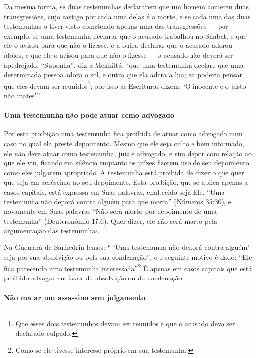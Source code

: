 Da mesma forma, se duas testemunhas declararem que um homem cometeu duas
transgressões, cujo castigo por cada uma delas é a morte, e se cada uma
das duas testemunhas o tiver visto cometendo apenas uma das
transgressões --- por exemplo, se uma testemunha declarar que o acusado
trabalhou no Shabat, e que ele o avisou para que não o fizesse, e a
outra declarar que o acusado adorou ídolos, e que ele o avisou para que
não o fizesse --- o acusado não deverá ser apedrejado. ``Suponha'', diz
a Mekhiltá, ``que uma testemunha declare que uma determinada pessoa
adora o sol, e outra que ela adora a lua;
eu poderia pensar que eles devam ser reunidos\footnote{Que esses dois testemunhos devam ser reunidos e que o acusado deva ser declarado culpado.}; por
isso as Escrituras dizem: `O inocente e o justo não mates'''.

\paragraph{Uma testemunha não pode atuar como advogado}

Por esta proibição uma testemunha fica proibida de atuar como advogado
num caso no qual ela preste depoimento. Mesmo que ele seja culto e bem
informado, ele não deve atuar como testemunha, juiz e advogado, e sim
depor com relação ao que ele viu, ficando em silêncio enquanto os juízes
fizerem uso de seu depoimento como eles julgarem apropriado. A
testemunha está proibida de dizer o que quer que seja em acréscimo ao
seu depoimento. Esta proibição, que se aplica apenas a casos capitais,
está expressa em Suas palavras, enaltecido seja Ele, ``Uma testemunha
não deporá contra alguém para que morra'' (Números 35:30), e novamente
em Suas palavras ``Não será morto por depoimento de uma testemunha''
(Deuteronômio 17:6). Quer dizer, ele não será morto pela argumentação
das testemunhas.

Na Guemará de Sanhedrin lemos: `` `Uma testemunha não deporá contra
alguém' seja por sua absolvição ou pela sua condenação'', e o seguinte
motivo é dado: ``Ele fica parecendo uma testemunha
interessada''\footnote{Como se ele tivesse interesse próprio em sua testemunha.}
É apenas em casos capitais que está proibido advogar em favor da
absolvição ou da condenação.

\paragraph{Não matar um assassino sem julgamento}

